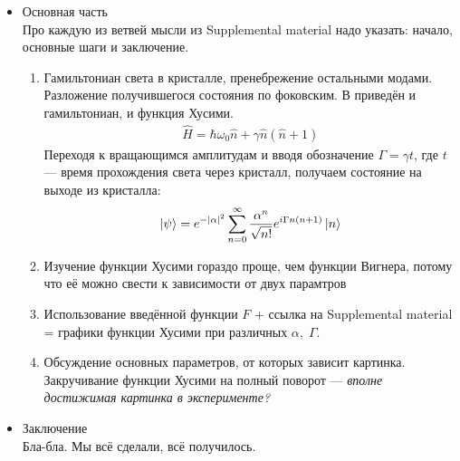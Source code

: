 \documentclass[a4paper, 12pt]{article}
\newenvironment{eqw}{\begin{equation} \begin{aligned}}   
    {\end{aligned}    \end{equation}}
\begin{document}
\begin{itemize}
    \item Основная часть\\
    Про каждую из ветвей мысли из Supplemental material надо указать: начало, основные шаги и заключение.
    \begin{enumerate}
        \item Гамильтониан света в кристалле, пренебрежение остальными модами. Разложение получившегося состояния по фоковским. В \cite{milburn1986quantum} приведён и гамильтониан, и функция Хусими.
        \begin{eqw}
            \hat H = \hbar \omega_0 \hat n + \gamma \hat n(\hat n + 1)
        \end{eqw}
        Переходя к вращающимся амплитудам и вводя обозначение $\Gamma = \gamma t$, где $t$ --- время прохождения света через кристалл, получаем состояние на выходе из кристалла:
        \begin{eqw}
            |\psi\rangle = e^{-|\alpha|^2}\sum\limits_{n=0}^{\infty}\frac{\alpha^n}{\sqrt{n!}}e^{i\Gamma n(n+1)}\ket{n}
        \end{eqw}
        \item Изучение функции Хусими гораздо проще, чем функции Вигнера, потому что её можно свести к зависимости от двух парамтров
        \item Использование введённой функции $F$ + ссылка на Supplemental material = графики функции Хусими при различных $\alpha, \; \Gamma$.
        \item Обсуждение основных параметров, от которых зависит картинка. Закручивание функции Хусими на полный поворот --- \textit{вполне достижимая картинка в эксперименте?}
    \end{enumerate}
    \item Заключение\\
    Бла-бла. Мы всё сделали, всё получилось.
\end{itemize}
\nocite{*}

\end{document}
